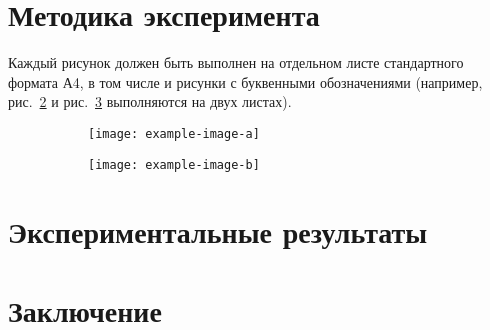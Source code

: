 \documentclass[14pt]{extarticle}
\begin{document}
\section{Методика эксперимента}

Каждый рисунок должен быть выполнен на отдельном листе стандартного формата А4,
в том числе и рисунки с буквенными обозначениями (например, рис.~\ref{fig1} и рис.~\ref{fig2} выполняются на двух листах).

\begin{figure}
	\centering
	\begin{subfigure}[]{80mm}
		\texttt{[image: example-image-a]}
		\caption[]{\label{fig1}}
	\end{subfigure}
	\caption[]{}
\end{figure}

\begin{figure}
	\ContinuedFloat
	\centering
	\begin{subfigure}[]{80mm}

		\texttt{[image: example-image-b]}
		\caption[]{\label{fig2}}
	\end{subfigure}
	\caption[Название рисунка, которое будет выводиться в списке иллюстраций]{\label{fig}}
\end{figure}

\section{Экспериментальные результаты}

\section{Заключение}

\newpage


\end{document}
